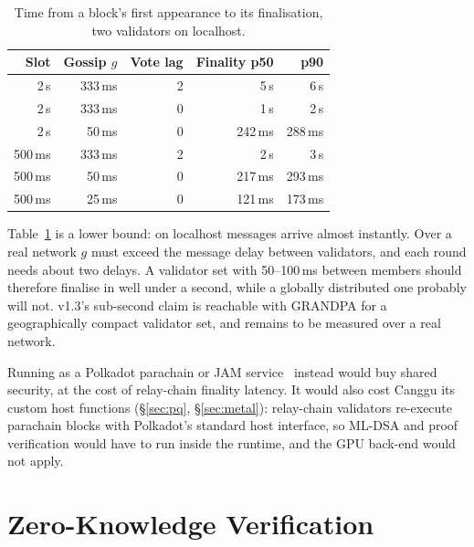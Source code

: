 \documentclass[11pt]{article}
\theoremstyle{definition}
\theoremstyle{remark}
\begin{document}
\begin{table}[ht]
\centering\small
\begin{tabular}{@{}rrrrr@{}}
\toprule
\textbf{Slot} & \textbf{Gossip $g$} & \textbf{Vote lag} & \textbf{Finality p50} & \textbf{p90} \\
\midrule
2\,s   & 333\,ms & 2 & 5\,s     & 6\,s \\
2\,s   & 333\,ms & 0 & 1\,s     & 2\,s \\
2\,s   & 50\,ms  & 0 & 242\,ms  & 288\,ms \\
500\,ms & 333\,ms & 2 & 2\,s    & 3\,s \\
500\,ms & 50\,ms & 0 & 217\,ms  & 293\,ms \\
500\,ms & 25\,ms & 0 & 121\,ms  & 173\,ms \\
\bottomrule
\end{tabular}
\caption{Time from a block's first appearance to its finalisation, two validators on localhost.}
\label{tab:finality}
\end{table}

Table~\ref{tab:finality} is a lower bound: on localhost messages arrive almost instantly. Over a
real network $g$ must exceed the message delay between validators, and each round needs about two
delays. A validator set with 50--100\,ms between members should therefore finalise in well under a
second, while a globally distributed one probably will not. v1.3's sub-second claim is reachable
with GRANDPA for a geographically compact validator set, and remains to be measured over a real
network.

Running as a Polkadot parachain or JAM service~\cite{graypaper} instead would buy shared security,
at the cost of relay-chain finality latency. It would also cost Canggu its custom host functions
(\S\ref{sec:pq}, \S\ref{sec:metal}): relay-chain validators re-execute parachain blocks with
Polkadot's standard host interface, so ML-DSA and proof verification would have to run inside the
runtime, and the GPU back-end would not apply.

\section{Zero-Knowledge Verification}
\label{sec:zk}
\end{document}

